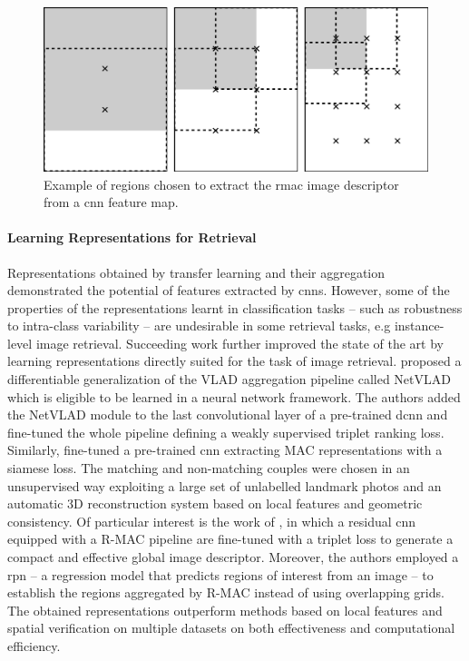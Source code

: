 \begin{figure}
    \centering
    \includegraphics[width=0.6\linewidth]{img/rmac-regions}
    \caption{Example of regions chosen to extract the \gls{rmac} image descriptor from a \gls{cnn} feature map. }
    \label{fig:back:rmac-regions}
\end{figure}

\paragraph{Learning Representations for Retrieval}
Representations obtained by transfer learning and their aggregation demonstrated the potential of features extracted by \glspl{cnn}.
However, some of the properties of the representations learnt in classification tasks -- such as robustness to intra-class variability -- are undesirable in some retrieval tasks, e.g instance-level image retrieval.
Succeeding work further improved the state of the art by learning representations directly suited for the task of image retrieval.
\citet{arandjelovic2016netvlad} proposed a differentiable generalization of the VLAD aggregation pipeline called NetVLAD which is eligible to be learned in a neural network framework.
The authors added the NetVLAD module to the last convolutional layer of a pre-trained \gls{dcnn} and fine-tuned the whole pipeline defining a weakly supervised triplet ranking loss.
Similarly, \citet{radenovic2016cnn} fine-tuned a pre-trained \gls{cnn} extracting MAC representations with a siamese loss.
The matching and non-matching couples were chosen in an unsupervised way exploiting a large set of unlabelled landmark photos and an automatic 3D reconstruction system based on local features and geometric consistency.
Of particular interest is the work of \citet{gordo2016deep,gordo2017end}, in which a residual \gls{cnn} equipped with a R-MAC pipeline are fine-tuned with a triplet loss to generate a compact and effective global image descriptor.
Moreover, the authors employed a \gls{rpn} -- a regression model that predicts regions of interest from an image -- to establish the regions aggregated by R-MAC instead of using overlapping grids.
The obtained representations outperform methods based on local features and spatial verification on multiple datasets on both effectiveness and computational efficiency.

